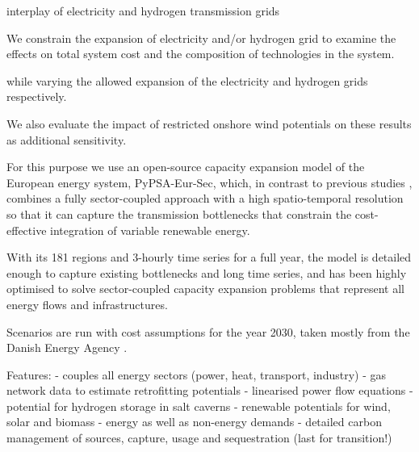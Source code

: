 interplay of electricity and hydrogen transmission grids

We constrain the expansion of electricity and/or hydrogen grid to examine the
effects on total system cost and the composition of technologies in the system.

while
varying the allowed expansion of the electricity and hydrogen grids
respectively.

We also evaluate the impact of restricted onshore wind potentials on these
results as additional sensitivity.


For this purpose we use an open-source capacity expansion model of the European
energy system, PyPSA-Eur-Sec, which, in contrast to previous studies
\cite{henningComprehensiveModel2014,mathiesenSmartEnergy2015,IEESWV,connollySmartEnergy2016,lofflerDesigningModel2017,blancoPotentialHydrogen2018,brownSynergiesSector2018,in-depth_2018,victoria2020},
combines a fully sector-coupled approach with a high spatio-temporal resolution
so that it can capture the transmission bottlenecks that constrain the
cost-effective integration of variable renewable energy.

With its 181 regions and 3-hourly time series for a full year, the model is
detailed enough to capture existing bottlenecks and long time series, and has
been highly optimised to solve sector-coupled capacity expansion problems that
represent all energy flows and infrastructures.

Scenarios are run with cost assumptions for the year 2030, taken mostly from the
Danish Energy Agency \cite{}.

Features:
- couples all energy sectors (power, heat, transport, industry)
- gas network data to estimate retrofitting potentials
- linearised power flow equations
- potential for hydrogen storage in salt caverns
- renewable potentials for wind, solar and biomass
- energy as well as non-energy demands
- detailed carbon management of sources, capture, usage and sequestration (last for transition!)



